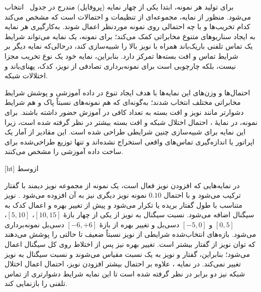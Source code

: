 
برای تولید هر نمونه، ابتدا یکی از چهار نمایه (پروفایل) مندرج در جدول~ انتخاب می‌شود. منظور از نمایه، مجموعه‌ای از تنظیمات و احتمالات است که مشخص می‌کند کدام تخریب‌ها و با چه احتمالی روی نمونه موردنظر اعمال شوند. به‌کارگیری هر نمایه به ایجاد سناریوهای متنوع مخابراتی کمک می‌کند؛ برای نمونه، یک نمایه می‌تواند شرایط یک تماس تلفنی باریک‌باند همراه با نویز بالا را شبیه‌سازی کند، درحالی‌که نمایه دیگر بر شرایط تماس  و افت بسته‌ها تمرکز دارد. بنابراین، نمایه خود یک نوع تخریب مجزا نیست، بلکه چارچوبی است برای نمونه‌برداری تصادفی از نویز، کدک، پهنای‌باند و اختلالات شبکه.

احتمال‌ها و وزن‌های این نمایه‌ها با هدف ایجاد تنوع در داده آموزشی و پوشش شرایط مخابراتی مختلف انتخاب شدند؛ به‌گونه‌ای که هم نمونه‌های نسبتاً پاک و هم شرایط دشوارتر مانند نویز و افت بسته به تعداد کافی در آموزش حضور داشته باشند. برای نمونه، در نمایهٔ ، احتمال اختلال شبکه و افت بسته بیشتر در نظر گرفته شده است، زیرا این نمایه برای شبیه‌سازی چنین شرایطی طراحی شده است. این مقادیر از آمار یک اپراتور یا اندازه‌گیری تماس‌های واقعی استخراج نشده‌اند و تنها توزیع طراحی‌شده برای ساخت داده آموزشی را مشخص می‌کنند.

[ht]
‌ازوسط

در نمایه‌هایی که افزودن نویز فعال است، یک نمونه از مجموعه نویز دیمند با گفتار ترکیب می‌شود و با احتمال $0.10$ نمونه نویز دیگری نیز به آن افزوده می‌شود . نویز متناسب با طول گفتار بریده یا تکرار می‌شود و پیش از تغییر بهره و اعمال کدک به سیگنال اضافه می‌شود. نسبت سیگنال به نویز از یکی از چهار بازهٔ $[10,15]$، $[5,10]$، $[0,5]$ و $[-5,0]$ دسی‌بل و تغییر بهره از بازهٔ $[-6,+6]$ دسی‌بل نمونه‌برداری می‌شود. بازه‌های انتخاب‌شده شرایطی از نویز نسبتاً ضعیف تا حالتی را پوشش می‌دهند که توان نویز از گفتار بیشتر است. تغییر بهره نیز پس از اختلاط روی کل سیگنال اعمال می‌شود؛ بنابراین، گفتار و نویز به یک نسبت مقیاس می‌شوند و نسبت سیگنال به نویز تغییر نمی‌کند. در نمایه ، علاوه بر احتمال بیشتر افزودن نویز، احتمال اعمال اختلال شبکه نیز دو برابر  در نظر گرفته شده است تا این نمایه شرایط دشوارتری از تماس تلفنی را بازنمایی کند.



